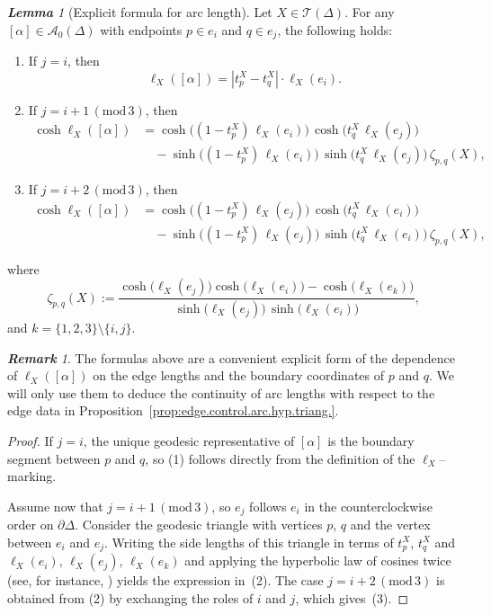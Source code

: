 \documentclass[11pt, letterpaper]{amsart}
\theoremstyle{definition}
\theoremstyle{remark}
\newtheorem{lemma}[theorem]{\rm\bf Lemma}
\newtheorem{remark}[theorem]{\rm\bf Remark}
\newcommand{\cA}{\mathcal{A}}
\newcommand{\cT}{\mathcal{T}}
\numberwithin{equation}{section}
\begin{document}
\begin{lemma}[Explicit formula for arc length]
\label{clm:express.length}
Let $X\in\cT(\Delta)$.
For any $[\alpha]\in\cA_0(\Delta)$ with endpoints $p\in e_i$ and $q\in e_j$, the following holds:
\begin{enumerate}
\item If $j=i$, then
\[
\ell_X([\alpha]) = |t_p^X - t_q^X|\cdot \ell_X(e_i).
\]
\item If $j=i+1 \,(\mathrm{mod}\,3)$, then
\[
\begin{split}
\cosh \ell_X([\alpha])
&= \cosh\big((1-t_p^X)\,\ell_X(e_i)\big)\,
   \cosh\big(t_q^X\,\ell_X(e_j)\big) \\
&\quad - \sinh\big((1-t_p^X)\,\ell_X(e_i)\big)\,
          \sinh\big(t_q^X\,\ell_X(e_j)\big)\,\zeta_{p,q}(X),
\end{split}
\]
\item If $j=i+2 \,(\mathrm{mod}\,3)$, then
\[
\begin{split}
\cosh \ell_X([\alpha])
&= \cosh\big((1-t_p^X)\,\ell_X(e_j)\big)\,
   \cosh\big(t_q^X\,\ell_X(e_i)\big) \\
&\quad - \sinh\big((1-t_p^X)\,\ell_X(e_j)\big)\,
          \sinh\big(t_q^X\,\ell_X(e_i)\big)\,\zeta_{p,q}(X),
\end{split}
\]
\end{enumerate}
where
\[
\zeta_{p,q}(X)
:= \frac{\cosh\big(\ell_X(e_j)\big)\cosh\big(\ell_X(e_i)\big)
        - \cosh\big(\ell_X(e_k)\big)}
       {\sinh\big(\ell_X(e_j)\big)\,\sinh\big(\ell_X(e_i)\big)},
\]
and $k=\{1,2,3\}\setminus\{i,j\}$.
\end{lemma}

\begin{remark}
The formulas above are a convenient explicit form of the dependence of
$\ell_X([\alpha])$ on the edge lengths and the boundary coordinates of $p$ and $q$.
We will only use them to deduce the continuity of arc lengths with respect to the
edge data in Proposition~\ref{prop:edge.control.arc.hyp.triang.}.
\end{remark}

\begin{proof}
If $j=i$, the unique geodesic representative of $[\alpha]$ is the boundary segment
between $p$ and $q$, so (1) follows directly from the definition of the $\ell_X$–marking.

Assume now that $j=i+1 \,(\mathrm{mod}\,3)$, so $e_j$ follows $e_i$ in the
counterclockwise order on $\partial\Delta$.
Consider the geodesic triangle with vertices $p$, $q$ and the vertex between
$e_i$ and $e_j$.
Writing the side lengths of this triangle in terms of $t_p^X$, $t_q^X$ and
$\ell_X(e_i)$, $\ell_X(e_j)$, $\ell_X(e_k)$ and applying the hyperbolic law of
cosines twice (see, for instance, \cite[§2.1]{Bus92}) yields the expression in~(2).
The case $j=i+2 \,(\mathrm{mod}\,3)$ is obtained from (2) by exchanging the roles of
$i$ and $j$, which gives~(3).
\end{proof}
\end{document}
